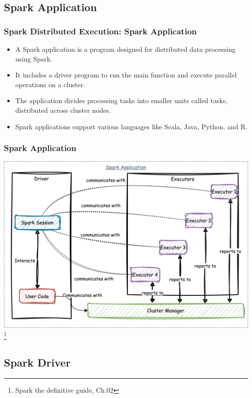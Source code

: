 \subsection{Spark Application}\label{subsec:spark-application}
\begin{frame}
    \frametitle{Spark Distributed Execution: Spark Application}

    \begin{itemize}
        \item A Spark application is a program designed for distributed data processing using Spark.\pause
        \item It includes a driver program to run the main function and execute parallel operations on a cluster.\pause
        \item The application divides processing tasks into smaller units called tasks, distributed across cluster nodes.\pause
        \item Spark applications support various languages like Scala, Java, Python, and R.\pause
    \end{itemize}

\end{frame}

\begin{frame}
    \frametitle{Spark Application}

    \includegraphics[width=\textwidth,height=.75\textheight,keepaspectratio]{./Figures/chapter-04/SparkCourse.drawio}\footnote{Spark the definitive guide, Ch.02}

\end{frame}

\subsection{Spark Driver}\label{subsec:spark-driver}

